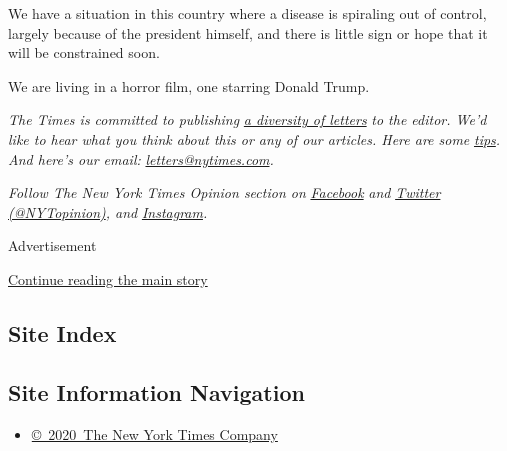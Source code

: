 We have a situation in this country where a disease is spiraling out of
control, largely because of the president himself, and there is little
sign or hope that it will be constrained soon.

We are living in a horror film, one starring Donald Trump.

\emph{The Times is committed to publishing}
\href{https://www.nytimes.com/2019/01/31/opinion/letters/letters-to-editor-new-york-times-women.html}{\emph{a
diversity of letters}} \emph{to the editor. We'd like to hear what you
think about this or any of our articles. Here are some}
\href{https://help.nytimes.com/hc/en-us/articles/115014925288-How-to-submit-a-letter-to-the-editor}{\emph{tips}}\emph{.
And here's our email:}
\href{mailto:letters@nytimes.com}{\emph{letters@nytimes.com}}\emph{.}

\emph{Follow The New York Times Opinion section on}
\href{https://www.facebook.com/nytopinion}{\emph{Facebook}} \emph{and}
\href{http://twitter.com/NYTOpinion}{\emph{Twitter
(@NYTopinion)}}\emph{, and}
\href{https://www.instagram.com/nytopinion/}{\emph{Instagram}}\emph{.}

Advertisement

\protect\hyperlink{after-bottom}{Continue reading the main story}

\hypertarget{site-index}{%
\subsection{Site Index}\label{site-index}}

\hypertarget{site-information-navigation}{%
\subsection{Site Information
Navigation}\label{site-information-navigation}}

\begin{itemize}
\tightlist
\item
  \href{https://help.nytimes.com/hc/en-us/articles/115014792127-Copyright-notice}{©~2020~The
  New York Times Company}
\end{itemize}

